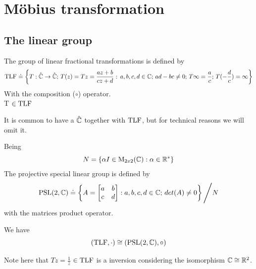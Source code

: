 \section{Möbius transformation}\label{TLF} %
\subsection{The linear group}

\begin{definicao} The group of linear fractional transformations is defined by
\begin{equation*}
\operatorname{TLF} \doteq \left\{ T:\hat{\mathbb{C}}\rightarrow\hat{\mathbb{C}}\text{; }T(z)=Tz=\frac{az+b}{cz+d}\text{ : }a,b,c,d \in \mathbb{C}\text{; }ad-bc\neq0\text{; }T\infty=\frac{a}{c}\text{; }T(-\frac{d}{c})=\infty \right\}
\end{equation*}
With the composition ($\circ$) operator.\\
T $\in \operatorname{TLF}$ 
\end{definicao}

\begin{obs}
It is common to have a $\hat{\mathbb{C}}$ together with $\operatorname{TLF}$, but for technical reasons we will omit it.
\end{obs}

\begin{definicao}
Being
\begin{equation*}
N = \left\{ \alpha I \in \operatorname{M}_{2x2}(\mathbb{C}) : \alpha \in \mathbb{R}^* \right\}
\end{equation*}
The projective special linear group is defined by 
\begin{equation*}
\operatorname{PSL}(2, \mathbb{C}) \doteq \left\{ A = \begin{bmatrix}
a & b\\
c & d
\end{bmatrix} : a,b,c,d \in \mathbb{C}\text{; }det(A)\neq0 \right\} \Bigg/ N
\end{equation*}
with the matrices product operator.
\end{definicao}

\begin{teorema}
We have
\begin{equation*}
(\operatorname{TLF}, \cdot) \cong (\operatorname{PSL}(2, \mathbb{C}), \circ)
\end{equation*}
\end{teorema}

Note here that $Tz = \frac{1}{z}$ $\in \operatorname{TLF}$ is a inversion considering the isomorphism $\mathbb{C} \cong \mathbb{R}^2$.

